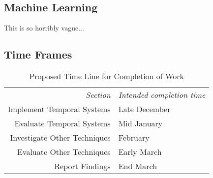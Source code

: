 \documentclass{mprop}
\begin{document}
\subsection{Machine Learning}
This is so horribly vague...

\subsection{Time Frames}
\begin{table}[H]\label{table:time-allocation}
\begin{center}
\begin{tabular}{r|l}
    \emph{Section} & \emph{Intended completion time}\\
    Implement Temporal Systems & Late December\\
    Evaluate Temporal Systems & Mid January\\
    Investigate Other Techniques & February\\
    Evaluate Other Techniques & Early March\\
    Report Findings & End March\\
\end{tabular}\par
    \caption{Proposed Time Line for Completion of Work}
\end{center}
\end{table}



\end{document}
